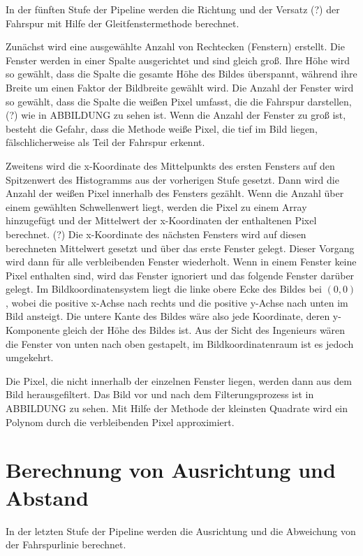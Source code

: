\documentclass[arbeit=studie,oneside,BCOR=12mm]{ArbeitRST}
\begin{document}
In der fünften Stufe der Pipeline werden die Richtung und der Versatz (?) der
Fahrspur mit Hilfe der Gleitfenstermethode berechnet.

Zunächst wird eine ausgewählte Anzahl von Rechtecken (Fenstern) erstellt. Die
Fenster werden in einer Spalte ausgerichtet und sind gleich groß. Ihre Höhe
wird so gewählt, dass die Spalte die gesamte Höhe des Bildes überspannt,
während ihre Breite um einen Faktor der Bildbreite gewählt wird. Die Anzahl der
Fenster wird so gewählt, dass die Spalte die weißen Pixel umfasst, die die
Fahrspur darstellen, (?) wie in ABBILDUNG zu sehen ist. Wenn die Anzahl der
Fenster zu groß ist, besteht die Gefahr, dass die Methode weiße Pixel, die tief
im Bild liegen, fälschlicherweise als Teil der Fahrspur erkennt. 

Zweitens wird die x-Koordinate des Mittelpunkts des ersten Fensters auf den
Spitzenwert des Histogramms aus der vorherigen Stufe gesetzt. Dann wird die
Anzahl der weißen Pixel innerhalb des Fensters gezählt. Wenn die Anzahl über
einem gewählten Schwellenwert liegt, werden die Pixel zu einem Array
hinzugefügt und der Mittelwert der x-Koordinaten der enthaltenen Pixel
berechnet. (?) Die x-Koordinate des nächsten Fensters wird auf diesen
berechneten Mittelwert gesetzt und über das erste Fenster gelegt. Dieser
Vorgang wird dann für alle verbleibenden Fenster wiederholt. Wenn in einem
Fenster keine Pixel enthalten sind, wird das Fenster ignoriert und das folgende
Fenster darüber gelegt. Im Bildkoordinatensystem liegt die linke obere Ecke des
Bildes bei $(0, 0)$, wobei die positive x-Achse nach rechts und die positive
y-Achse nach unten im Bild ansteigt. Die untere Kante des Bildes wäre also jede
Koordinate, deren y-Komponente gleich der Höhe des Bildes ist. Aus der Sicht
des Ingenieurs wären die Fenster von unten nach oben gestapelt, im
Bildkoordinatenraum ist es jedoch umgekehrt. 

Die Pixel, die nicht innerhalb der einzelnen Fenster liegen, werden dann aus
dem Bild herausgefiltert. Das Bild vor und nach dem Filterungsprozess ist in
ABBILDUNG zu sehen. Mit Hilfe der Methode der kleinsten Quadrate wird ein
Polynom durch die verbleibenden Pixel approximiert.

\section{Berechnung von Ausrichtung und Abstand}

In der letzten Stufe der Pipeline werden die Ausrichtung und die Abweichung von
der Fahrspurlinie berechnet. 
\end{document}
